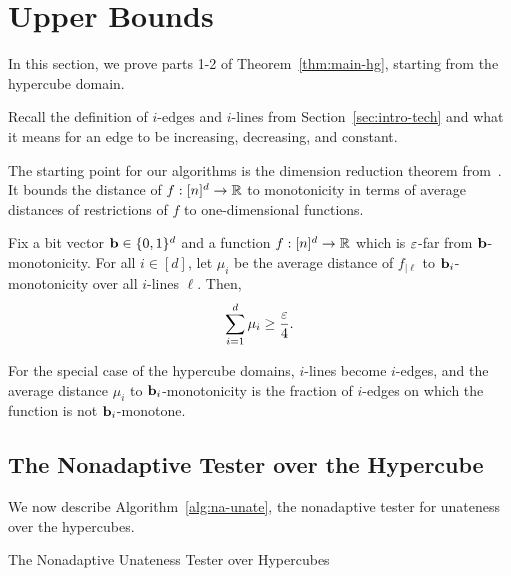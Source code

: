 \chapter{Upper Bounds}\label{sec:upper-bounds}

In this section, we prove parts 1-2 of Theorem~\ref{thm:main-hg}, starting from the hypercube domain.

Recall the definition of $i$-edges and $i$-lines from Section~\ref{sec:intro-tech} and what it means for an edge to be increasing, decreasing, and constant.

The starting point for our algorithms is the dimension reduction theorem from~\cite{CDJS17}. It bounds the distance of $f:[n]^d \to {\mathbb R}$ to monotonicity in terms of average distances of restrictions of $f$ to one-dimensional functions.
\begin{theorem} \label{thm:dimred} Fix a bit vector ${\bf b}\in\{0,1\}^d$ and a function $f:[n]^d \to {\mathbb R}$ which is $\varepsilon$-far from ${\bf b}$-monotonicity.
	For all $i\in[d]$, let $\mu_i$ be the average distance of $f_{|\ell}$ to $\mathbf{b}_i$-monotonicity over all $i$-lines $\ell$.
	Then, $$\sum_{i=1}^d \mu_i \geq \frac{\varepsilon}{4}.$$
\end{theorem}
For the special case of the hypercube domains, $i$-lines become $i$-edges, and the average distance $\mu_i$ to $\mathbf{b}_i$-monotonicity is the fraction of $i$-edges on which the function is not $\mathbf{b}_i$-monotone.


\section{The Nonadaptive Tester over the Hypercube}\label{sec:non-adap-ub}
We now describe Algorithm~\ref{alg:na-unate}, the nonadaptive tester for unateness over the hypercubes.

\begin{algorithm}
\caption{The Nonadaptive Unateness Tester over Hypercubes} \label{alg:na-unate}
\DontPrintSemicolon
\BlankLine
\nl {}
\;
\end{algorithm}

